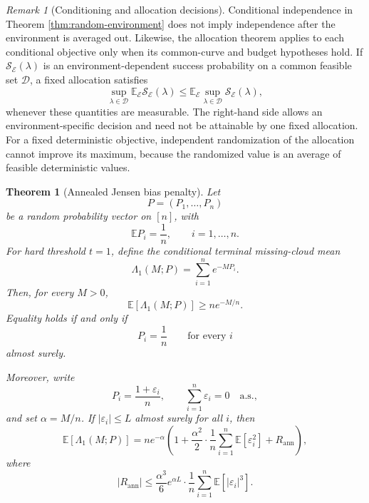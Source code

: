 \documentclass[11pt]{article}
\newtheorem{theorem}{Theorem}
\theoremstyle{definition}
\theoremstyle{remark}
\newtheorem{remark}{Remark}
\newcommand{\E}{\mathbb E}
\newcommand{\1}{\mathbf 1}
\begin{document}
\begin{remark}[Conditioning and allocation decisions]
Conditional independence in Theorem \ref{thm:random-environment}
does not imply independence after the environment is averaged out.
Likewise, the allocation theorem applies to each conditional
objective only when its common-curve and budget hypotheses hold.
If \(\mathcal S_{\mathcal E}(\lambda)\) is an
environment-dependent success probability on a common feasible
set \(\mathcal D\), a fixed allocation satisfies
\[
 \sup_{\lambda\in\mathcal D}
       \E_{\mathcal E}\mathcal S_{\mathcal E}(\lambda)
 \le
 \E_{\mathcal E}\sup_{\lambda\in\mathcal D}
       \mathcal S_{\mathcal E}(\lambda),
\]
whenever these quantities are measurable.  The right-hand side
allows an environment-specific decision and need not be attainable
by one fixed allocation.  For a fixed deterministic objective,
independent randomization of the allocation cannot improve its
maximum, because the randomized value is an average of feasible
deterministic values.
\end{remark}

\begin{theorem}[Annealed Jensen bias penalty]\label{thm:annealed-jensen}
Let
\[
  P=(P_1,\ldots,P_n)
\]
be a random probability vector on \([n]\), with
\[
  \E P_i=\frac1n,
  \qquad i=1,\ldots,n.
\]
For hard threshold \(t=1\), define the conditional terminal missing-cloud mean
\[
  \Lambda_1(M;P)=\sum_{i=1}^n e^{-MP_i}.
\]
Then, for every \(M>0\),
\[
  \E[\Lambda_1(M;P)]\ge n e^{-M/n}.
\]
Equality holds if and only if
\[
  P_i=\frac1n\qquad\text{for every }i
\]
almost surely.

Moreover, write
\[
  P_i=\frac{1+\varepsilon_i}{n},
  \qquad \sum_{i=1}^n\varepsilon_i=0\quad\text{a.s.},
\]
and set \(\alpha=M/n\).  If \(|\varepsilon_i|\le L\) almost surely for all \(i\), then
\[
  \E[\Lambda_1(M;P)]
  =n e^{-\alpha}\left(
  1+\frac{\alpha^2}{2}\cdot\frac1n\sum_{i=1}^n\E[\varepsilon_i^2]
  +R_{\mathrm{ann}}
  \right),
\]
where
\[
  |R_{\mathrm{ann}}|
  \le
  \frac{\alpha^3}{6}e^{\alpha L}
  \cdot \frac1n\sum_{i=1}^n\E[|\varepsilon_i|^3].
\]
\end{theorem}
\end{document}
